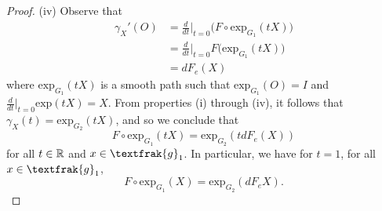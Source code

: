 \documentclass{article}
\begin{document}
\begin{proof}
    (iv) Observe that 
    \begin{align*}
        {\gamma}_{X}'(O) &= \frac{ d }{ dt  }  \Big|_{t = 0} \Big(F \circ {\text{exp}}_{{G}_{1}} (tX)\Big) \\
                         &= \frac{ d }{ dt  }  \Big|_{t = 0 } F\Big({\text{exp}}_{{G}_{1}}(tX)\Big) \\
                         &= d {F}_{e}(X)
    \end{align*}
    where \( {\text{exp}}_{{G}_{1}}(tX)  \) is a smooth path such that \( {\text{exp}}_{{G}_{1}}(O) = I  \) and \( \displaystyle \frac{ d }{ dt  } \Big|_{t = 0} \text{exp}(tX) = X   \). From properties (i) through (iv), it follows that \( {\gamma}_{X}(t) = {\text{exp}}_{{G}_{2}}(tX) \), and so we conclude that 
    \[  F \circ {\text{exp}}_{{G}_{1}}(tX) = {\text{exp}}_{{G}_{2}}(t d {F}_{e}(X)) \]
    for all \( t \in \mathbb{R}  \) and \( x \in {\textfrak{g}}_{1} \). In particular, we have for \( t = 1  \), for all \( x \in {\textfrak{g}}_{1} \), 
    \[  F \circ {\text{exp}}_{{G}_{1}}(X) = {\text{exp}}_{{G}_{2}}(d {F}_{e}X). \]
\end{proof}
\end{document}

